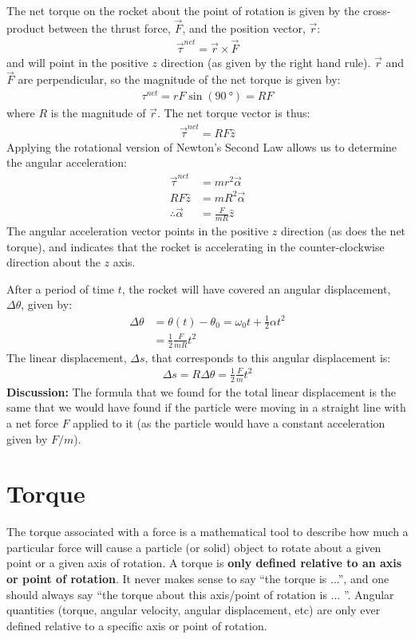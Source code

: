 \begin{example}
The net torque on the rocket about the point of rotation is given by the cross-product between the thrust force, $\vec F$, and the position vector, $\vec r$:
\begin{align*}
\vec\tau^{net} = \vec r\times\vec F
\end{align*}
and will point in the positive $z$ direction (as given by the right hand rule). $\vec r$ and $\vec F$ are perpendicular, so the magnitude of the net torque is given by:
\begin{align*}
\tau^{net} = rF \sin(\SI{90}{\degree}) = RF
\end{align*}
where $R$ is the magnitude of $\vec r$. The net torque vector is thus:
\begin{align*}
\vec\tau^{net} = RF \hat z
\end{align*}
Applying the rotational version of Newton's Second Law allows us to determine the angular acceleration:
\begin{align*}
\vec \tau ^{net} &= mr^2\vec\alpha\\
RF \hat z&= mR^2\vec\alpha\\
\therefore \vec \alpha &= \frac{F}{mR}\hat z
\end{align*}
The angular acceleration vector points in the positive $z$ direction (as does the net torque), and indicates that the rocket is accelerating in the counter-clockwise direction about the $z$ axis. 

After a period of time $t$, the rocket will have covered an angular displacement, $\Delta \theta$, given by:
\begin{align*}
\Delta \theta &= \theta(t)-\theta_0 = \omega_0t + \frac{1}{2}\alpha t^2\\
&=\frac{1}{2}\frac{F}{mR} t^2
\end{align*}
The linear displacement, $\Delta s$, that corresponds to this angular displacement is:
\begin{align*}
\Delta s = R \Delta\theta = \frac{1}{2}\frac{F}{m} t^2
\end{align*}
\textbf{Discussion:} The formula that we found for the total linear displacement is the same that we would have found if the particle were moving in a straight line with a net force $F$ applied to it (as the particle would have a constant acceleration given by $F/m$).
\end{example}


\section{Torque}
The torque associated with a force is a mathematical tool to describe how much a particular force will cause a particle (or solid) object to rotate about a given point or a given axis of rotation. A torque is \textbf{only defined relative to an axis or point of rotation}. It never makes sense to say ``the torque is ...'', and one should always say ``the torque about this axis/point of rotation is ... ''. Angular quantities (torque, angular velocity, angular displacement, etc) are only ever defined relative to a specific axis or point of rotation.

